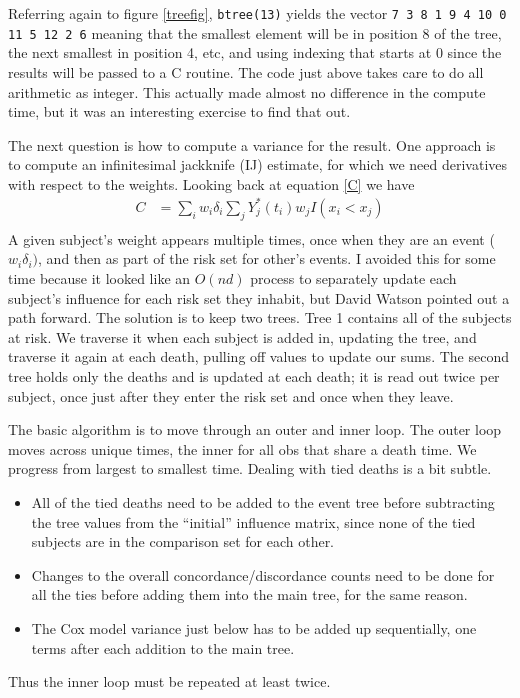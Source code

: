\documentclass{article}
\newcommand{\code}[1]{\texttt{#1}}
\begin{document}
Referring again to figure \ref{treefig}, \code{btree(13)} yields the vector
\code{7  3  8  1  9  4 10  0 11  5 12  2  6}
meaning that the smallest element
will be in position 8 of the tree, the next smallest in position 4, etc,
and using indexing that starts at 0 since the results will be passed to a C
routine.
The code just above takes care to do all arithmetic as integer.  
This actually made almost no difference in the compute time, but it was an
interesting exercise to find that out.

The next question is how to compute a variance for the result.
One approach is to compute an infinitesimal jackknife (IJ) estimate,
for which we need derivatives with respect to the weights.
Looking back at equation \eqref{C} we have
\begin{align}
  C  &= \sum_i  w_i \delta_i \sum_j Y^*_j(t_i) w_j I(x_i < x_j) 
  \nonumber\\
\end{align}
A given subject's weight appears multiple times, once when they are an
event ($w_i \delta_i)$, and then as part of the risk set for other's
events.  I avoided this for some time because it looked like an $O(nd)$
process to separately update each subject's influence for each risk set
they inhabit, but David Watson pointed out a path forward.
The solution is to keep two trees.  
Tree 1 contains all of the subjects at risk.  We traverse it when each subject
is added in, updating the tree, 
and traverse it again at each death, pulling off values to update our sums. 
The second tree holds only the deaths and is updated at each death;
it is read out twice per subject,
once just after they enter the risk set and once when they leave.

The basic algorithm is to move through an outer and inner loop.  The
outer loop moves across unique times, the inner for all obs that
share a death time.  We progress from largest to smallest time.
Dealing with tied deaths is  a bit subtle.
\begin{itemize}
  \item All of the tied deaths need to be added to the event tree before
    subtracting the tree values from the ``initial'' influence matrix, since
    none of the tied subjects are in the comparison set for each other.
  \item Changes to the overall concordance/discordance counts need to be done
    for all the ties before adding them into the main tree, for the same reason.
  \item The Cox model variance just below has to be added up sequentially,
    one terms after each addition to the main tree.
\end{itemize}
Thus the inner loop must be repeated at least twice.
\end{document}
